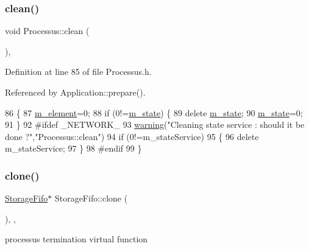 \subsubsection{\texorpdfstring{clean()}{clean()}}
{\footnotesize\ttfamily void Processus\+::clean (\begin{DoxyParamCaption}{ }\end{DoxyParamCaption})\hspace{0.3cm}{\ttfamily [inline]}, {\ttfamily [inherited]}}



Definition at line 85 of file Processus.\+h.



Referenced by Application\+::prepare().


\begin{DoxyCode}
86   \{
87     \hyperlink{classProcessus_aa9d24d53c3e52f36786cabb5d8e296e7}{m\_element}=0;
88     \textcolor{keywordflow}{if} (0!=\hyperlink{classProcessus_ab3539eee42891ceae0baf4395ae7fb61}{m\_state}) \{
89       \textcolor{keyword}{delete} \hyperlink{classProcessus_ab3539eee42891ceae0baf4395ae7fb61}{m\_state};
90       \hyperlink{classProcessus_ab3539eee42891ceae0baf4395ae7fb61}{m\_state}=0;
91     \}
92 \textcolor{preprocessor}{#ifdef \_NETWORK\_
}
93     \hyperlink{classObject_a65cd4fda577711660821fd2cd5a3b4c9}{warning}(\textcolor{stringliteral}{"Cleaning state service : should it be done ?"},\textcolor{stringliteral}{"Processus::clean"})
94       if (0!=m\_stateService)
95       \{
96         \textcolor{keyword}{delete} m\_stateService;
97       \}
98 \textcolor{preprocessor}{#endif
}
99   \}
\end{DoxyCode}
\mbox{\label{classStorageFifo_a80b534eb6d81a3b570f6957d6a932987}} 
\subsubsection{\texorpdfstring{clone()}{clone()}}
{\footnotesize\ttfamily \hyperlink{classStorageFifo_1_1StorageFifo}{Storage\+Fifo}$\ast$ Storage\+Fifo\+::clone (\begin{DoxyParamCaption}{ }\end{DoxyParamCaption})\hspace{0.3cm}{\ttfamily [inline]}, {\ttfamily [protected]}, {\ttfamily [virtual]}}

processus termination virtual function 

